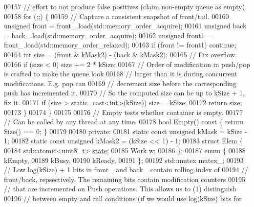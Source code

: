 \begin{DoxyCode}
00157     \textcolor{comment}{// effort to not produce false positives (claim non-empty queue as empty).}
00158     \textcolor{keywordflow}{for} (;;) \{
00159       \textcolor{comment}{// Capture a consistent snapshot of front/tail.}
00160       \textcolor{keywordtype}{unsigned} front = front\_.load(std::memory\_order\_acquire);
00161       \textcolor{keywordtype}{unsigned} back = back\_.load(std::memory\_order\_acquire);
00162       \textcolor{keywordtype}{unsigned} front1 = front\_.load(std::memory\_order\_relaxed);
00163       \textcolor{keywordflow}{if} (front != front1) \textcolor{keywordflow}{continue};
00164       \textcolor{keywordtype}{int} size = (front & kMask2) - (back & kMask2);
00165       \textcolor{comment}{// Fix overflow.}
00166       \textcolor{keywordflow}{if} (size < 0) size += 2 * kSize;
00167       \textcolor{comment}{// Order of modification in push/pop is crafted to make the queue look}
00168       \textcolor{comment}{// larger than it is during concurrent modifications. E.g. pop can}
00169       \textcolor{comment}{// decrement size before the corresponding push has incremented it.}
00170       \textcolor{comment}{// So the computed size can be up to kSize + 1, fix it.}
00171       \textcolor{keywordflow}{if} (size > static\_cast<int>(kSize)) size = kSize;
00172       \textcolor{keywordflow}{return} size;
00173     \}
00174   \}
00175 
00176   \textcolor{comment}{// Empty tests whether container is empty.}
00177   \textcolor{comment}{// Can be called by any thread at any time.}
00178   \textcolor{keywordtype}{bool} Empty()\textcolor{keyword}{ const }\{ \textcolor{keywordflow}{return} Size() == 0; \}
00179 
00180  \textcolor{keyword}{private}:
00181   \textcolor{keyword}{static} \textcolor{keyword}{const} \textcolor{keywordtype}{unsigned} kMask = kSize - 1;
00182   \textcolor{keyword}{static} \textcolor{keyword}{const} \textcolor{keywordtype}{unsigned} kMask2 = (kSize << 1) - 1;
00183   \textcolor{keyword}{struct }Elem \{
00184     std::atomic<uint8\_t> \hyperlink{structstate}{state};
00185     Work w;
00186   \};
00187   \textcolor{keyword}{enum} \{
00188     kEmpty,
00189     kBusy,
00190     kReady,
00191   \};
00192   std::mutex mutex\_;
00193   \textcolor{comment}{// Low log(kSize) + 1 bits in front\_ and back\_ contain rolling index of}
00194   \textcolor{comment}{// front/back, repsectively. The remaining bits contain modification counters}
00195   \textcolor{comment}{// that are incremented on Push operations. This allows us to (1) distinguish}
00196   \textcolor{comment}{// between empty and full conditions (if we would use log(kSize) bits for}

\end{DoxyCode}
